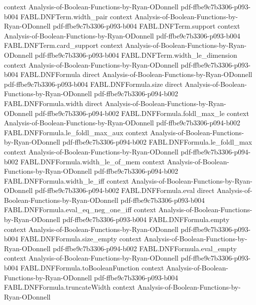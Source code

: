 \begin{theorem}
  {context}
  {Analysis-of-Boolean-Functions-by-Ryan-ODonnell}
  {pdf-ffbe9c7b3306-p093-b004}
\proofstep
  {FABL.DNFTerm.width_pair}
  {context}
  {Analysis-of-Boolean-Functions-by-Ryan-ODonnell}
  {pdf-ffbe9c7b3306-p093-b004}
\proofstep
  {FABL.DNFTerm.support}
  {context}
  {Analysis-of-Boolean-Functions-by-Ryan-ODonnell}
  {pdf-ffbe9c7b3306-p093-b004}
\proofstep
  {FABL.DNFTerm.card_support}
  {context}
  {Analysis-of-Boolean-Functions-by-Ryan-ODonnell}
  {pdf-ffbe9c7b3306-p093-b004}
\proofstep
  {FABL.DNFTerm.width_le_dimension}
  {context}
  {Analysis-of-Boolean-Functions-by-Ryan-ODonnell}
  {pdf-ffbe9c7b3306-p093-b004}
\proofstep
  {FABL.DNFFormula}
  {direct}
  {Analysis-of-Boolean-Functions-by-Ryan-ODonnell}
  {pdf-ffbe9c7b3306-p093-b004}
\proofstep
  {FABL.DNFFormula.size}
  {direct}
  {Analysis-of-Boolean-Functions-by-Ryan-ODonnell}
  {pdf-ffbe9c7b3306-p094-b002}
\proofstep
  {FABL.DNFFormula.width}
  {direct}
  {Analysis-of-Boolean-Functions-by-Ryan-ODonnell}
  {pdf-ffbe9c7b3306-p094-b002}
\proofstep
  {FABL.DNFFormula.foldl_max_le}
  {context}
  {Analysis-of-Boolean-Functions-by-Ryan-ODonnell}
  {pdf-ffbe9c7b3306-p094-b002}
\proofstep
  {FABL.DNFFormula.le_foldl_max_aux}
  {context}
  {Analysis-of-Boolean-Functions-by-Ryan-ODonnell}
  {pdf-ffbe9c7b3306-p094-b002}
\proofstep
  {FABL.DNFFormula.le_foldl_max}
  {context}
  {Analysis-of-Boolean-Functions-by-Ryan-ODonnell}
  {pdf-ffbe9c7b3306-p094-b002}
\proofstep
  {FABL.DNFFormula.width_le_of_mem}
  {context}
  {Analysis-of-Boolean-Functions-by-Ryan-ODonnell}
  {pdf-ffbe9c7b3306-p094-b002}
\proofstep
  {FABL.DNFFormula.width_le_iff}
  {context}
  {Analysis-of-Boolean-Functions-by-Ryan-ODonnell}
  {pdf-ffbe9c7b3306-p094-b002}
\proofstep
  {FABL.DNFFormula.eval}
  {direct}
  {Analysis-of-Boolean-Functions-by-Ryan-ODonnell}
  {pdf-ffbe9c7b3306-p093-b004}
\proofstep
  {FABL.DNFFormula.eval_eq_neg_one_iff}
  {context}
  {Analysis-of-Boolean-Functions-by-Ryan-ODonnell}
  {pdf-ffbe9c7b3306-p093-b004}
\proofstep
  {FABL.DNFFormula.empty}
  {context}
  {Analysis-of-Boolean-Functions-by-Ryan-ODonnell}
  {pdf-ffbe9c7b3306-p093-b004}
\proofstep
  {FABL.DNFFormula.size_empty}
  {context}
  {Analysis-of-Boolean-Functions-by-Ryan-ODonnell}
  {pdf-ffbe9c7b3306-p094-b002}
\proofstep
  {FABL.DNFFormula.eval_empty}
  {context}
  {Analysis-of-Boolean-Functions-by-Ryan-ODonnell}
  {pdf-ffbe9c7b3306-p093-b004}
\proofstep
  {FABL.DNFFormula.toBooleanFunction}
  {context}
  {Analysis-of-Boolean-Functions-by-Ryan-ODonnell}
  {pdf-ffbe9c7b3306-p093-b004}
\proofstep
  {FABL.DNFFormula.truncateWidth}
  {context}
  {Analysis-of-Boolean-Functions-by-Ryan-ODonnell}

\end{theorem}
